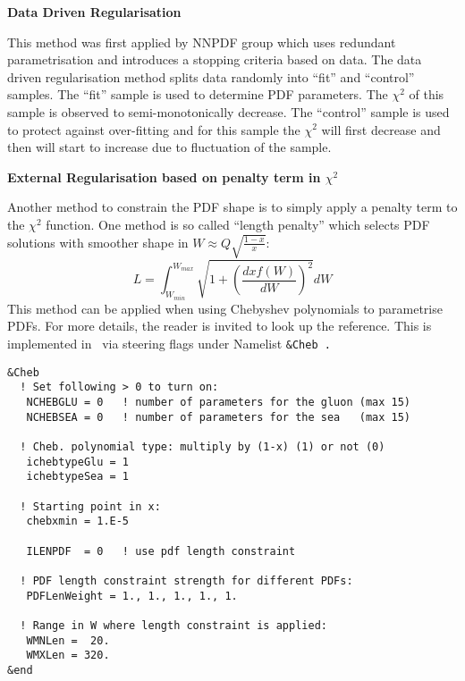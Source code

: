 
\begin{description}

\item \bf{Data Driven Regularisation}\rm

This method was first applied by NNPDF group which uses redundant parametrisation and introduces a stopping criteria based on data.
The data driven regularisation method splits data randomly into ``fit'' and ``control''  samples. The ``fit'' sample is used to determine PDF parameters. The $\chi^2$ of this sample is observed to semi-monotonically decrease. The ``control'' sample is used to protect against over-fitting and for this sample the $\chi^2$ will first decrease and then will start to increase due to fluctuation of the sample.


\item \bf{External Regularisation based on penalty term in $\chi^2$} \rm

Another method to constrain the PDF shape is to simply apply a penalty term
to the $\chi^2$ function. 
One method is so called ``length penalty'' which selects PDF solutions with smoother shape in $W\approx Q\sqrt{\frac{1-x}{x}}$:
\begin{equation}
L=\int_{W_{min}}^{W_{max}} \sqrt{1+\left(\frac{dxf(W)}{dW}\right)^2}dW
\end{equation}
This method can be applied when using Chebyshev polynomials to parametrise PDFs.
For more details, the reader is invited to look up the \cite{Chebyshev} reference.
This is implemented in \fitter\ via steering flags under Namelist \tt \&Cheb \rm.
\begin{verbatim}
&Cheb
  ! Set following > 0 to turn on:
   NCHEBGLU = 0   ! number of parameters for the gluon (max 15)
   NCHEBSEA = 0   ! number of parameters for the sea   (max 15)

  ! Cheb. polynomial type: multiply by (1-x) (1) or not (0)  
   ichebtypeGlu = 1 
   ichebtypeSea = 1 

  ! Starting point in x:
   chebxmin = 1.E-5

   ILENPDF  = 0   ! use pdf length constraint

  ! PDF length constraint strength for different PDFs:
   PDFLenWeight = 1., 1., 1., 1., 1.     

  ! Range in W where length constraint is applied:
   WMNLen =  20.
   WMXLen = 320.
&end
\end{verbatim}


\end{description}
